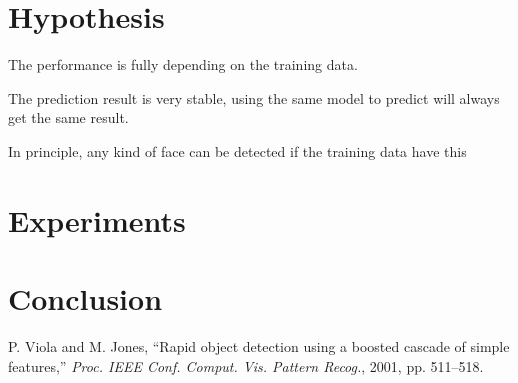 \documentclass[10pt,twocolumn,letterpaper]{article}
\begin{document}
\section{Hypothesis}

The performance is fully depending on the training data.

The prediction result is very stable, using the same model to predict will always get the same result.

In principle, any kind of face can be detected if the training data have this 

\section{Experiments}

\section{Conclusion}

\begin{thebibliography}{9}
P. Viola and M. Jones, ``Rapid object detection using a boosted cascade of simple features,''
\textit{Proc. IEEE Conf. Comput. Vis. Pattern Recog.}, 2001, pp. 511–518.


\end{thebibliography}
\end{document}

